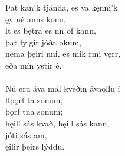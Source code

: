 \bva Þat kan'k tjánda, \hld es va kęnni'k \\%
\ind {}ęy né anns konu, \\%
lt es bętra \hld es nn of kann, \\%
\ind þat fylgir jóða okum, \\%
nema þęiri nni, \hld es mik rmi vęrr, \\%
\ind eða mín ystir é.\\%

 \\

\bva Nú eru áva mál \hld kveðin ávaǫllu í \\%
\ind {}llþǫrf ta sonum, \\%
\ind {}þǫrf tna sonum; \\%
hęill sás kvað, \hld hęill sás kann, \\%
\ind {}jóti sás am, \\%
\ind {}ęilir þęirs lýddu.\footnotemark[50]\\%

 \\
